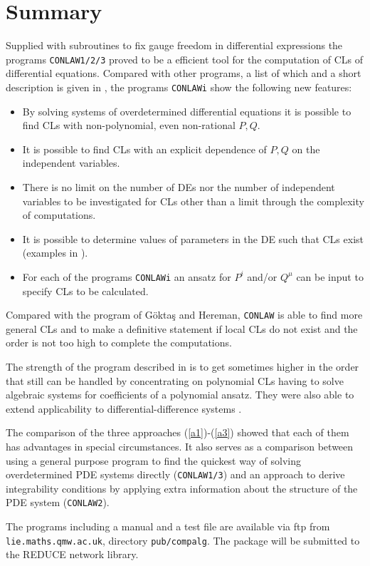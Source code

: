 \section{Summary}
Supplied with subroutines to fix gauge freedom in differential expressions
the programs {\tt CONLAW1/2/3} proved to be a efficient tool for the
computation of CLs of differential equations. Compared with other
programs, a list of which and a short description is given in \cite{GH1},
the programs {\tt CONLAWi} show the following new features:
\begin{itemize}
\item
By solving systems of overdetermined differential equations
it is possible to find CLs with non-polynomial, even non-rational
$P, Q$.
\item
It is possible to find CLs with an explicit dependence of $P, Q$ on
the independent variables.
\item
There is no limit on the number of DEs nor the number of independent
variables to be investigated for CLs other than a limit through the
complexity of computations.
\item
It is possible to determine values of parameters in the DE such that 
CLs exist (examples in \cite{TW}). 
\item
For each of the programs {\tt CONLAWi} 
an ansatz for $P^i$ and/or $Q^{\mu}$ can be input to specify
CLs to be calculated. 
\end{itemize}
Compared with the program of G\"{o}kta\c{s} and Hereman, {\tt CONLAW}
is able to find more general CLs and to make a definitive statement
if local CLs do not exist and the order is not too high to complete
the computations. 

The strength of the program described in \cite{GH1} is to get 
sometimes higher in the order that still can be handled
by concentrating on polynomial CLs having to solve
algebraic systems for coefficients of a polynomial ansatz.
They were also able to extend applicability to differential-difference
systems \cite{GH2}.

The comparison of the three approaches (\ref{a1})-(\ref{a3}) showed
that each of them has advantages in special circumstances. It also
serves as a comparison between using a general purpose program to find the
quickest way of solving overdetermined PDE systems directly
({\tt CONLAW1/3}) and an approach to derive integrability 
conditions by applying extra information about the structure of
the PDE system ({\tt CONLAW2}).

The programs including a manual and a test file
are available via ftp from {\tt lie.maths.qmw.ac.uk},
directory {\tt pub/compalg}.
The package will be submitted to the REDUCE network library.

